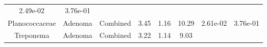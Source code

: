\documentclass[12pt,]{article}
\begin{document}
\begin{longtable}[]{@{}cccccccc@{}}
\begin{minipage}[t]{0.06\columnwidth}
2.49e-02\strut
\end{minipage} & \begin{minipage}[t]{0.06\columnwidth}\centering\strut
3.76e-01\strut
\end{minipage}\tabularnewline
\begin{minipage}[t]{0.19\columnwidth}\centering\strut
Planococcaceae\strut
\end{minipage} & \begin{minipage}[t]{0.07\columnwidth}\centering\strut
Adenoma\strut
\end{minipage} & \begin{minipage}[t]{0.09\columnwidth}\centering\strut
Combined\strut
\end{minipage} & \begin{minipage}[t]{0.03\columnwidth}\centering\strut
3.45\strut
\end{minipage} & \begin{minipage}[t]{0.14\columnwidth}\centering\strut
1.16\strut
\end{minipage} & \begin{minipage}[t]{0.14\columnwidth}\centering\strut
10.29\strut
\end{minipage} & \begin{minipage}[t]{0.06\columnwidth}\centering\strut
2.61e-02\strut
\end{minipage} & \begin{minipage}[t]{0.06\columnwidth}\centering\strut
3.76e-01\strut
\end{minipage}\tabularnewline
\begin{minipage}[t]{0.19\columnwidth}\centering\strut
Treponema\strut
\end{minipage} & \begin{minipage}[t]{0.07\columnwidth}\centering\strut
Adenoma\strut
\end{minipage} & \begin{minipage}[t]{0.09\columnwidth}\centering\strut
Combined\strut
\end{minipage} & \begin{minipage}[t]{0.03\columnwidth}\centering\strut
3.22\strut
\end{minipage} & \begin{minipage}[t]{0.14\columnwidth}\centering\strut
1.14\strut
\end{minipage} & \begin{minipage}[t]{0.14\columnwidth}\centering\strut
9.03\strut
\end{minipage} & \begin{minipage}[t]{0.06\columnwidth}\centering\strut

\end{minipage}
\end{longtable}
\end{document}
